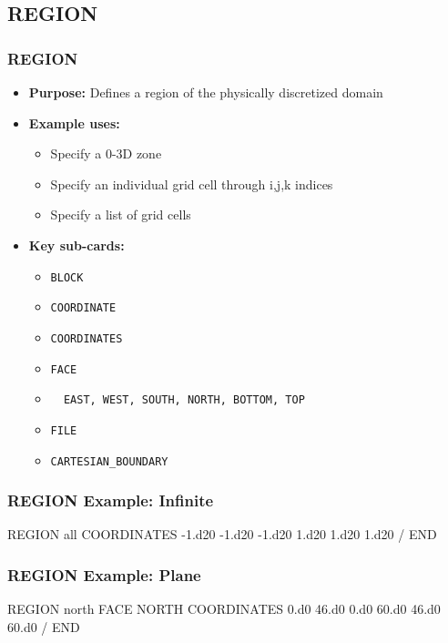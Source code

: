 \subsection{REGION}

\begin{frame}\frametitle{REGION}

\begin{itemize}
\item[] \textbf{Purpose:} Defines a region of the physically discretized domain
\item[] \textbf{Example uses:}
\begin{itemize}
  \item Specify a 0-3D zone
  \item Specify an individual grid cell through i,j,k indices
  \item Specify a list of grid cells
\end{itemize}
\item[] \textbf{Key sub-cards:}
\begin{itemize}
  \item[] \verb|BLOCK|
  \item[] \verb|COORDINATE|
  \item[] \verb|COORDINATES|
  \item[] \verb|FACE|
  \item[] \verb|  EAST, WEST, SOUTH, NORTH, BOTTOM, TOP|
  \item[] \verb|FILE|
  \item[] \verb|CARTESIAN_BOUNDARY|
\end{itemize}
\end{itemize}

\end{frame}

\begin{frame}[fragile]\frametitle{REGION Example: Infinite}

\begin{semiverbatim}
REGION all
  COORDINATES
    -1.d20 -1.d20 -1.d20
    1.d20 1.d20 1.d20
  /
END
\end{semiverbatim}

\end{frame}

\begin{frame}[fragile]\frametitle{REGION Example: Plane}

\begin{semiverbatim}
REGION north
  FACE NORTH
  COORDINATES
    0.d0 46.d0 0.d0
    60.d0 46.d0 60.d0
  /
END
\end{semiverbatim}

\end{frame}

